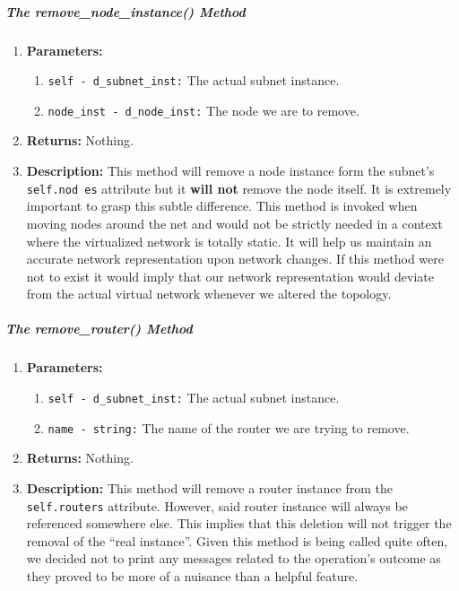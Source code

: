        \subparagraph{The remove\_node\_instance() Method}
            \begin{enumerate}
                \item \textbf{Parameters:}
                \begin{enumerate}
                    \item \texttt{self - d\_subnet\_inst:} The actual subnet instance.
                    \item \texttt{node\_inst - d\_node\_inst:} The node we are to remove.
                \end{enumerate}
                \item \textbf{Returns:} Nothing.
                \item \textbf{Description:} This method will remove a node instance form the subnet's \texttt{self.nod es} attribute but it \textbf{will not} remove the node itself. It is extremely important to grasp this subtle difference. This method is invoked when moving nodes around the net and would not be strictly needed in a context where the virtualized network is totally static. It will help us maintain an accurate network representation upon network changes. If this method were not to exist it would imply that our network representation would deviate from the actual virtual network whenever we altered the topology.
            \end{enumerate}

        \subparagraph{The remove\_router() Method}
            \begin{enumerate}
                \item \textbf{Parameters:}
                \begin{enumerate}
                    \item \texttt{self - d\_subnet\_inst:} The actual subnet instance.
                    \item \texttt{name - string:} The name of the router we are trying to remove.
                \end{enumerate}
                \item \textbf{Returns:} Nothing.
                \item \textbf{Description:} This method will remove a router instance from the \texttt{self.routers} attribute. However, said router instance will always be referenced somewhere else. This implies that this deletion will not trigger the removal of the ``real instance''. Given this method is being called quite often, we decided not to print any messages related to the operation's outcome as they proved to be more of a nuisance than a helpful feature.
            \end{enumerate}

